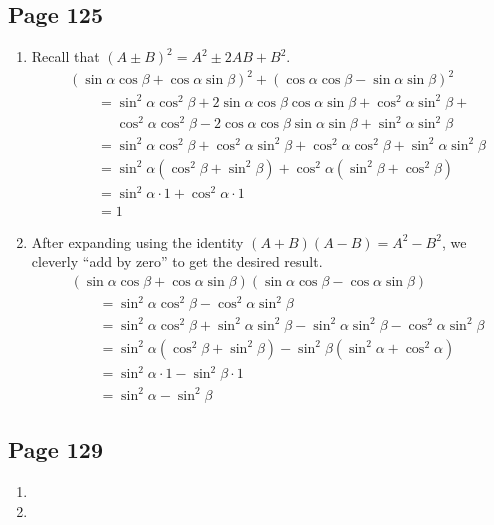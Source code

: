 \documentclass{article}
\newenvironment{solutions}[1]
{\subsection*{#1}
 \begin{enumerate}[leftmargin=1.5em]}
{\end{enumerate}}
\newcommand{\solution}{\item}
\begin{document}
\begin{solutions}{Page 125}
\solution %
Recall that $\left(A \pm B\right)^2 = A^2 \pm 2AB + B^2$.
\begin{align*}
&\left(\sin{\alpha}\cos{\beta} + \cos{\alpha}\sin{\beta}\right)^2 + \left(\cos{\alpha}\cos{\beta} - \sin{\alpha}\sin{\beta}\right)^2 \\
&\qquad =\sin^{2}{\alpha}\cos^{2}{\beta} + 2\sin{\alpha}\cos{\beta}\cos{\alpha}\sin{\beta} + \cos^{2}{\alpha}\sin^{2}{\beta} + \\
&\qquad \phantom{=}\cos^{2}{\alpha}\cos^{2}{\beta} - 2\cos{\alpha}\cos{\beta}\sin{\alpha}\sin{\beta} + \sin^{2}{\alpha}\sin^{2}{\beta} \\
&\qquad =\sin^{2}{\alpha}\cos^{2}{\beta} + \cos^{2}{\alpha}\sin^{2}{\beta} + \cos^{2}{\alpha}\cos^{2}{\beta} + \sin^{2}{\alpha}\sin^{2}{\beta} \\
&\qquad =\sin^{2}{\alpha} \left(\cos^{2}{\beta} + \sin^{2}{\beta}\right) + \cos^{2}{\alpha} \left(\sin^{2}{\beta} + \cos^{2}{\beta}\right) \\
&\qquad = \sin^{2}{\alpha} \cdot 1 + \cos^{2}{\alpha} \cdot 1 \\
&\qquad = 1
\end{align*}

\solution %
After expanding using the identity $\left(A+B\right)\left(A-B\right) = A^2-B^2$, we cleverly ``add by zero'' to get the desired result.
\begin{align*}
&\left(\sin{\alpha}\cos{\beta} + \cos{\alpha}\sin{\beta}\right)\left(\sin{\alpha}\cos{\beta} - \cos{\alpha}\sin{\beta}\right) \\
&\qquad =\sin^{2}{\alpha}\cos^{2}{\beta} - \cos^{2}{\alpha}\sin^{2}{\beta} \\
&\qquad =\sin^{2}{\alpha}\cos^{2}{\beta} + \sin^{2}{\alpha}\sin^{2}{\beta} - \sin^{2}{\alpha}\sin^{2}{\beta} - \cos^{2}{\alpha}\sin^{2}{\beta} \\
&\qquad =\sin^{2}{\alpha}\left(\cos^{2}{\beta} + \sin^{2}{\beta}\right) - \sin^{2}{\beta}\left(\sin^{2}{\alpha} + \cos^{2}{\alpha}\right) \\
&\qquad =\sin^{2}{\alpha} \cdot 1 - \sin^2{\beta} \cdot 1 \\
&\qquad =\sin^{2}{\alpha} - \sin^2{\beta}
\end{align*}
\end{solutions}

\begin{solutions}{Page 129}
\solution %

\solution %
\end{solutions}
\end{document}
